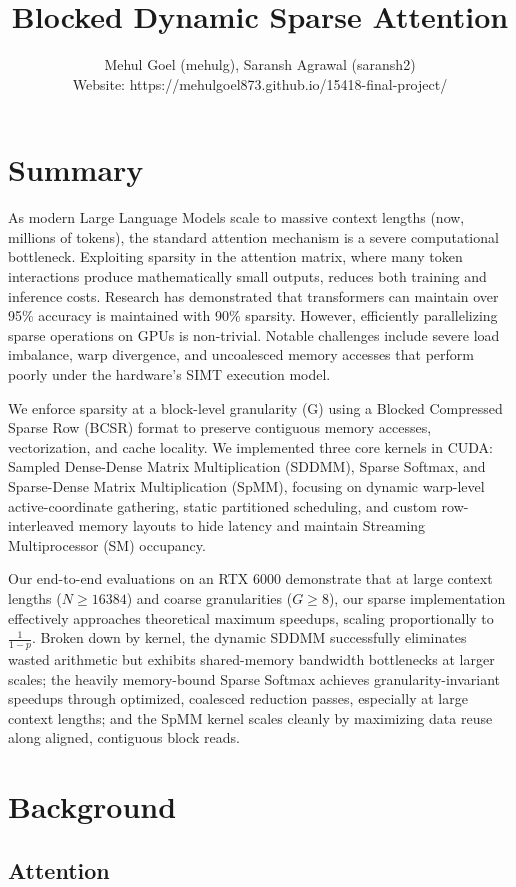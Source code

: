 \documentclass[11pt]{article}
\title{Blocked Dynamic Sparse Attention}
\author{Mehul Goel (mehulg), Saransh Agrawal (saransh2) \\ \small Website: https://mehulgoel873.github.io/15418-final-project/}
\date{}
\begin{document}
\maketitle


\section*{Summary}
As modern Large Language Models scale to massive context lengths (now, millions of tokens), the standard attention mechanism is a severe computational bottleneck. Exploiting sparsity in the attention matrix, where many token interactions produce mathematically small outputs, reduces both training and inference costs. Research has demonstrated that transformers can maintain over 95\% accuracy is maintained with 90\% sparsity. However, efficiently parallelizing sparse operations on GPUs is non-trivial. Notable challenges include severe load imbalance, warp divergence, and uncoalesced memory accesses that perform poorly under the hardware's SIMT execution model. 

We enforce sparsity at a block-level granularity (G) using a Blocked Compressed Sparse Row (BCSR) format to preserve contiguous memory accesses, vectorization, and cache locality. We implemented three core kernels in CUDA: Sampled Dense-Dense Matrix Multiplication (SDDMM), Sparse Softmax, and Sparse-Dense Matrix Multiplication (SpMM), focusing on dynamic warp-level active-coordinate gathering, static partitioned scheduling, and custom row-interleaved memory layouts to hide latency and maintain Streaming Multiprocessor (SM) occupancy.

Our end-to-end evaluations on an RTX 6000 demonstrate that at large context lengths ($N \geq 16384$) and coarse granularities ($G \ge 8$), our sparse implementation effectively approaches theoretical maximum speedups, scaling proportionally to $\frac{1}{1-p}$. Broken down by kernel, the dynamic SDDMM successfully eliminates wasted arithmetic but exhibits shared-memory bandwidth bottlenecks at larger scales; the heavily memory-bound Sparse Softmax achieves granularity-invariant speedups through optimized, coalesced reduction passes, especially at large context lengths; and the SpMM kernel scales cleanly by maximizing data reuse along aligned, contiguous block reads.

\section*{Background}
\subsection*{Attention}
\end{document}
